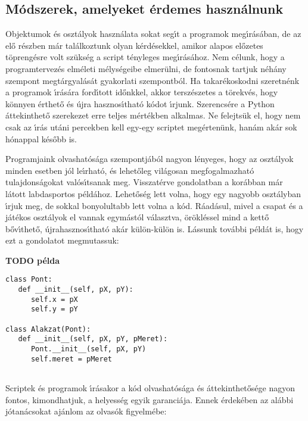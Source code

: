 \subsection{M\'odszerek, amelyeket \'erdemes haszn\'alnunk}

Objektumok \'es oszt\'alyok haszn\'alata sokat seg\'{\i}t a programok meg\'{\i}r\'as\'aban, de az el\H{o} r\'eszben 
m\'ar tal\'alkoztunk olyan k\'erd\'esekkel, amikor alapos el\H{o}zetes t\"opreng\'esre volt sz\"uks\'eg a script 
t\'enyleges meg\'{\i}r\'as\'ahoz. Nem c\'elunk, hogy a programtervez\'es elm\'eleti m\'elys\'egeibe elmer\"ulni, 
de fontosnak tartjuk n\'eh\'any szempont meg\-t\'ar\-gya\-l\'a\-s\'at gyakorlati szempontb\'ol. Ha takar\'ekoskodni 
szeretn\'enk a programok \'{\i}r\'as\'ara ford\'{\i}tott id\H{o}nkkel, akkor tersz\'eszetes a t\"orekv\'es, hogy 
k\"onnyen \'erthet\H{o} \'es \'ujra hasznos\'{\i}that\'o k\'odot \'{\i}rjunk. Szerencs\'ere a Python \'attekinthet\H{o} 
szerekezet erre teljes m\'ert\'ekben alkalmas. Ne felejts\"uk el, hogy nem csak az \'{\i}r\'as ut\'ani percekben kell 
egy-egy scriptet meg\'erten\"unk, han\'am ak\'ar sok h\'onappal k\'es\H{o}bb is.


Programjaink olvashat\'os\'aga szempontj\'ab\'ol nagyon l\'enyeges, hogy az oszt\'alyok minden esetben j\'ol le\'{\i}rhat\'o, 
\'es lehet\H{o}leg vil\'agosan megfogalmazhat\'o tulajdons\'agokat val\'os\'{\i}tsanak meg. Visszat\'erve gondolatban a 
kor\'abban m\'ar l\'atott labdasportos p\'eld\'ahoz. Lehet\H{o}s\'eg lett volna, hogy egy nagyobb oszt\'alyban \'{\i}rjuk 
meg, de sokkal bonyolultabb lett volna a k\'od. R\'aad\'asul, mivel a csapat \'es a j\'at\'ekos oszt\'alyok el vannak 
egym\'ast\'ol v\'alasztva, \"or\"okl\'essel mind a kett\H{o} b\H{o}v\'{\i}thet\H{o}, \'ujrahasznos\'{\i}that\'o ak\'ar 
k\"ul\"on-k\"ul\"on is. L\'assunk tov\'abbi p\'eld\'at is, hogy ezt a gondolatot megmutassuk:

{\noindent \bf TODO p\'elda}

\begin{Verbatim}[fontsize=\small]
class Pont:
   def __init__(self, pX, pY):
      self.x = pX
      self.y = pY

class Alakzat(Pont):
   def __init__(self, pX, pY, pMeret):
      Pont.__init__(self, pX, pY)
      self.meret = pMeret
      
\end{Verbatim}

Scriptek \'es programok \'{\i}r\'asakor a k\'od olvashat\'os\'aga \'es \'attekinthet\H{o}s\'ege nagyon fontos, kimondhatjuk, 
a helyess\'eg egyik garanci\'aja. Ennek \'erdek\'eben az al\'abbi j\'otan\'acsokat aj\'anlom az olvas\'ok figyelm\'ebe:

